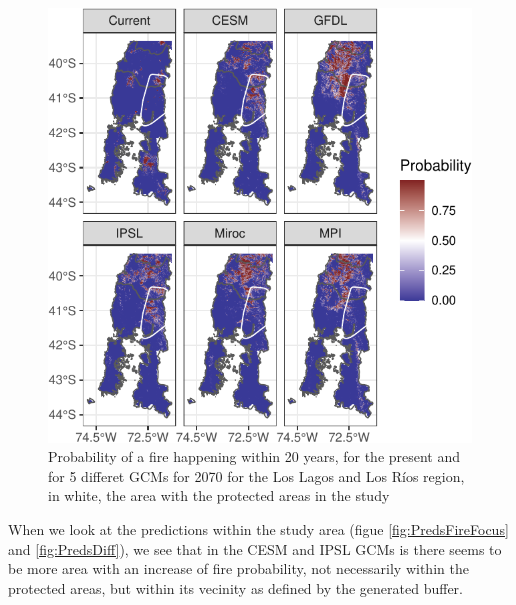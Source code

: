 \documentclass[
]{article}
\begin{document}
\begin{figure}
\centering
\includegraphics{Methods_files/figure-latex/PredsFire-1.pdf}
\caption{\label{fig:PredsFire}Probability of a fire happening within 20 years, for the present and for 5 differet GCMs for 2070 for the Los Lagos and Los Ríos region, in white, the area with the protected areas in the study}
\end{figure}

When we look at the predictions within the study area (figue \ref{fig:PredsFireFocus} and \ref{fig:PredsDiff}), we see that in the CESM and IPSL GCMs is there seems to be more area with an increase of fire probability, not necessarily within the protected areas, but within its vecinity as defined by the generated buffer.
\end{document}

